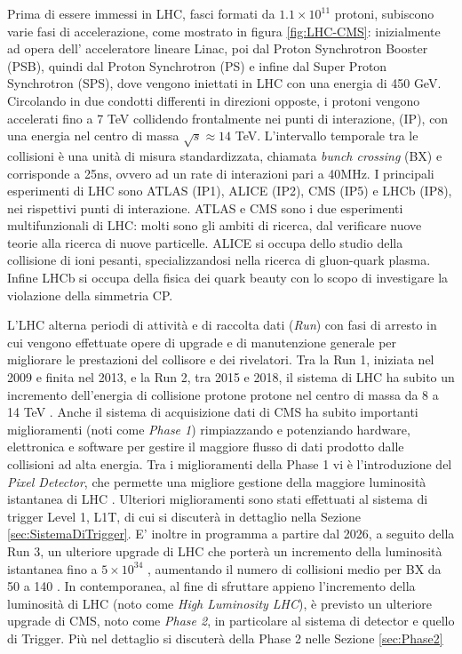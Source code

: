 Prima di essere immessi in LHC, fasci formati da $1.1 \times 10^{11}$ protoni, subiscono varie fasi di accelerazione, come mostrato in figura \ref{fig:LHC-CMS}: inizialmente ad opera dell' acceleratore lineare Linac, poi dal Proton Synchrotron Booster (PSB), quindi dal Proton Synchrotron (PS) e infine dal Super Proton Synchrotron (SPS), dove vengono iniettati in LHC con una energia di 450 GeV. Circolando in due condotti differenti in direzioni opposte, i protoni vengono accelerati fino a 7 TeV collidendo frontalmente nei punti di interazione, (IP), con una energia nel centro di massa $\sqrt{s} \approx 14$ TeV. L'intervallo temporale tra le collisioni è una unità di misura standardizzata, chiamata \textit{bunch crossing} (BX) e corrisponde a 25ns, ovvero ad un rate di interazioni pari a 40MHz.\newline
I principali esperimenti di LHC sono ATLAS (IP1), ALICE (IP2), CMS (IP5) e LHCb (IP8), nei rispettivi punti di interazione. \newline
ATLAS e CMS sono i due esperimenti multifunzionali di LHC: molti sono gli ambiti di ricerca, dal verificare nuove teorie alla ricerca di nuove particelle. ALICE si occupa dello studio della collisione di ioni pesanti, specializzandosi nella ricerca di gluon-quark plasma. Infine LHCb
si occupa della fisica dei quark beauty con lo scopo di investigare la violazione della simmetria CP.

L'LHC alterna periodi di attività e di raccolta dati (\textit{Run}) con fasi di arresto in cui vengono effettuate opere di upgrade e di manutenzione generale per migliorare le prestazioni del collisore e dei rivelatori. Tra la Run 1, iniziata nel 2009 e finita nel 2013, e la Run 2, tra 2015 e 2018, il sistema di LHC ha subito un incremento dell'energia di collisione protone protone nel centro di massa da 8 a 14 TeV \cite{sirunyan2020performance}. Anche il sistema di acquisizione dati di CMS ha subito importanti miglioramenti (noti come \textit{Phase 1}) rimpiazzando e potenziando hardware, elettronica e software per gestire il maggiore flusso di dati prodotto dalle collisioni ad alta energia. Tra i miglioramenti della Phase 1 vi è l'introduzione del \textit{Pixel Detector}, che permette una migliore gestione della maggiore luminosità istantanea di LHC \cite{Adam:2748381}. Ulteriori miglioramenti sono stati effettuati al sistema di trigger Level 1, L1T, di cui si discuterà in dettaglio nella Sezione \ref{sec:SistemaDiTrigger}. \newline
E' inoltre in programma a partire dal 2026, a seguito della Run 3, un ulteriore upgrade di LHC che porterà un incremento della luminosità istantanea fino a $5\times 10^{34}$ \Lumi, aumentando il numero di collisioni medio per BX da 50 a 140 \cite{collaboration2021phase}. In contemporanea, al fine di sfruttare appieno l'incremento della luminosità di LHC (noto come \textit{High Luminosity LHC}), è previsto un ulteriore upgrade di CMS, noto come \textit{Phase 2}, in particolare al sistema di detector e quello di Trigger. Più nel dettaglio si discuterà della Phase 2 nelle Sezione \ref{sec:Phase2}

